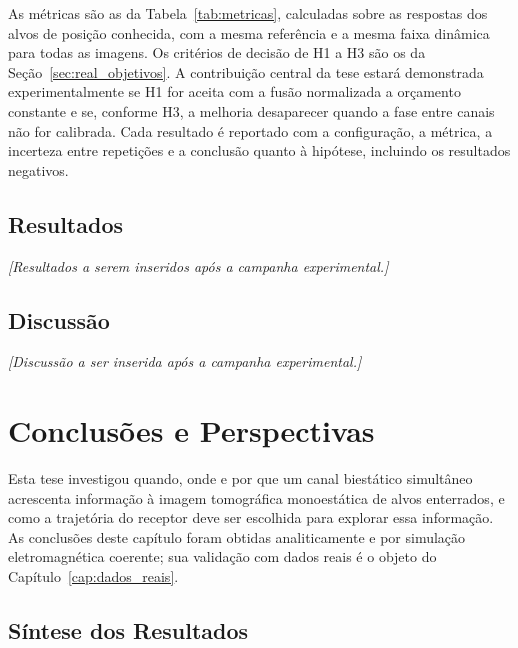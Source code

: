 \documentclass[12pt,a4paper,oneside]{book}
\theoremstyle{remark}
\theoremstyle{plain}
\theoremstyle{definition}
\begin{document}
As métricas são as da Tabela~\ref{tab:metricas}, calculadas sobre as respostas
dos alvos de posição conhecida, com a mesma referência e a mesma faixa dinâmica
para todas as imagens. Os critérios de decisão de H1 a H3 são os da
Seção~\ref{sec:real_objetivos}. A contribuição central da tese estará
demonstrada experimentalmente se H1 for aceita com a fusão normalizada a
orçamento constante e se, conforme H3, a melhoria desaparecer quando a fase
entre canais não for calibrada. Cada resultado é reportado com a configuração,
a métrica, a incerteza entre repetições e a conclusão quanto à hipótese,
incluindo os resultados negativos.

\section{Resultados}
\label{sec:real_resultados}


\textit{[Resultados a serem inseridos após a campanha experimental.]}

\section{Discussão}
\label{sec:real_discussao}


\textit{[Discussão a ser inserida após a campanha experimental.]}

\chapter{Conclusões e Perspectivas}
\label{cap:conclusoes}

Esta tese investigou quando, onde e por que um canal biestático simultâneo
acrescenta informação à imagem tomográfica monoestática de alvos enterrados, e como
a trajetória do receptor deve ser escolhida para explorar essa informação. As
conclusões deste capítulo foram obtidas analiticamente e por simulação
eletromagnética coerente; sua validação com dados reais é o objeto do
Capítulo~\ref{cap:dados_reais}.

\section{Síntese dos Resultados}
\label{sec:concl_respostas}
\end{document}
